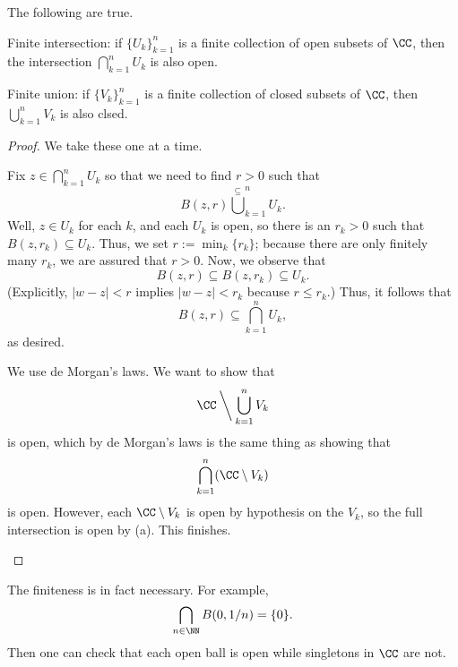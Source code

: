 \begin{lemma}
	The following are true.
	\begin{listalph}
		\item Finite intersection: if $\{U_k\}_{k=1}^n$ is a finite collection of open subsets of $\CC$, then the intersection $\bigcap_{k=1}^nU_k$ is also open.
		\item Finite union: if $\{V_k\}_{k=1}^n$ is a finite collection of closed subsets of $\CC$, then $\bigcup_{k=1}^nV_k$ is also clsed.
	\end{listalph}
\end{lemma}
\begin{proof}
	We take these one at a time.
	\begin{listalph}
		\item Fix $z\in\bigcap_{k=1}^nU_k$ so that we need to find $r>0$ such that
		\[B(z,r)\stackrel\subseteq\bigcup_{k=1}^nU_k.\]
		Well, $z\in U_k$ for each $k$, and each $U_k$ is open, so there is an $r_k>0$ such that $B(z,r_k)\subseteq U_k$. Thus, we set $r:=\min_k\{r_k\}$; because there are only finitely many $r_k$, we are assured that $r>0$. Now, we observe that
		\[B(z,r)\subseteq B(z,r_k)\subseteq U_k.\]
		(Explicitly, $|w-z|<r$ implies $|w-z|<r_k$ because $r\le r_k$.) Thus, it follows that
		\[B(z,r)\subseteq\bigcap_{k=1}^nU_k,\]
		as desired.
		\item We use de Morgan's laws. We want to show that
		\[\CC\mathbin{\bigg\backslash}\bigcup_{k=1}^nV_k\]
		is open, which by de Morgan's laws is the same thing as showing that
		\[\bigcap_{k=1}^n(\CC\setminus V_k)\]
		is open. However, each $\CC\setminus V_k$ is open by hypothesis on the $V_k$, so the full intersection is open by (a). This finishes.
		\qedhere
	\end{listalph}
\end{proof}
\begin{remark}
	The finiteness is in fact necessary. For example,
	\[\bigcap_{n\in\NN}B(0,1/n)=\{0\}.\]
	Then one can check that each open ball is open while singletons in $\CC$ are not.
\end{remark}

